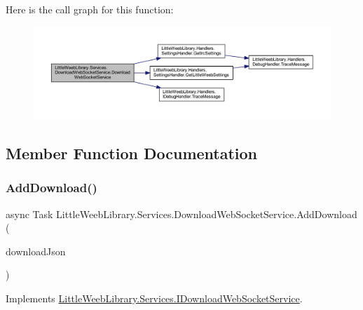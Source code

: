 Here is the call graph for this function\+:\nopagebreak
\begin{figure}[H]
\begin{center}
\leavevmode
\includegraphics[width=350pt]{class_little_weeb_library_1_1_services_1_1_download_web_socket_service_a33a4c5640800b885662c686013c02971_cgraph}
\end{center}
\end{figure}


\subsection{Member Function Documentation}
\mbox{\label{class_little_weeb_library_1_1_services_1_1_download_web_socket_service_a7aaa1db63ee81a2e5246e45ef8643087}} 
\subsubsection{\texorpdfstring{Add\+Download()}{AddDownload()}}
{\footnotesize\ttfamily async Task Little\+Weeb\+Library.\+Services.\+Download\+Web\+Socket\+Service.\+Add\+Download (\begin{DoxyParamCaption}\item[{J\+Object}]{download\+Json }\end{DoxyParamCaption})}



Implements \mbox{\hyperlink{interface_little_weeb_library_1_1_services_1_1_i_download_web_socket_service_ab33026e52e15229cd8fc79c7b37b76da}{Little\+Weeb\+Library.\+Services.\+I\+Download\+Web\+Socket\+Service}}.



